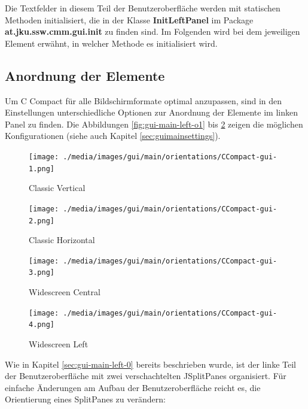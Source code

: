 Die Textfelder in diesem Teil der Benutzeroberfläche werden mit statischen Methoden initialisiert, die in der Klasse \textbf{InitLeftPanel} im Package \textbf{at.jku.ssw.cmm.gui.init} zu finden sind. Im Folgenden wird bei dem jeweiligen Element erwähnt, in welcher Methode es initialisiert wird.

\subsection{Anordnung der Elemente}
\label{sec:gui-main-left-ord}

Um C Compact für alle Bildschirmformate optimal anzupassen, sind in den Einstellungen unterschiedliche Optionen zur Anordnung der Elemente im linken Panel zu finden. Die Abbildungen \ref{fig:gui-main-left-o1} bis \ref{fig:gui-main-left-o4} zeigen die möglichen Konfigurationen (siehe auch Kapitel \ref{sec:guimainsettings}).

\begin{figure}
\centering
	\begin{minipage}{0.45\textwidth}
		\centering
		\texttt{[image: ./media/images/gui/main/orientations/CCompact-gui-1.png]}
		\caption{Classic Vertical}\label{fig:gui-main-left-o1}
	\end{minipage}\hfill
	\begin{minipage}{0.45\textwidth}
		\centering
		\texttt{[image: ./media/images/gui/main/orientations/CCompact-gui-2.png]}
		\caption{Classic Horizontal}\label{fig:gui-main-left-o2}
	\end{minipage}
\end{figure}

\begin{figure}
\centering
	\begin{minipage}{0.45\textwidth}
		\centering
		\texttt{[image: ./media/images/gui/main/orientations/CCompact-gui-3.png]}
		\caption{Widescreen Central}\label{fig:gui-main-left-o3}
	\end{minipage}\hfill
	\begin{minipage}{0.45\textwidth}
		\centering
		\texttt{[image: ./media/images/gui/main/orientations/CCompact-gui-4.png]}
		\caption{Widescreen Left}\label{fig:gui-main-left-o4}
	\end{minipage}
\end{figure}

Wie in Kapitel \ref{sec:gui-main-left-0} bereits beschrieben wurde, ist der linke Teil der Benutzeroberfläche mit zwei verschachtelten JSplitPanes organisiert. Für einfache Änderungen am Aufbau der Benutzeroberfläche reicht es, die Orientierung eines SplitPanes zu verändern:

